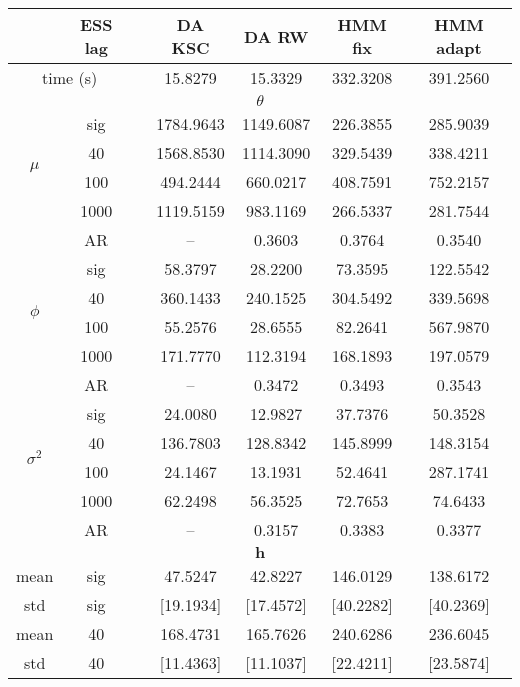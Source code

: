 { \renewcommand{\arraystretch}{1.2} 
\begin{table} 
\center 
\begin{tabular}{ccc cc cc} 
\hline 
 & ESS lag&& DA KSC & DA RW & HMM fix & HMM adapt \\ \hline  \hline
 \multicolumn{2}{c}{time (s)}& & 15.8279  & 15.3329  & 332.3208  & 391.2560  \\  \hline 
\multicolumn{7}{c}{$\theta$} \\ \hline 
\multirow{4}{*}{$\mu$}   & sig &  & 1784.9643  & 1149.6087  & 226.3855  & 285.9039  \\ 
 & 40 &  & 1568.8530  & 1114.3090  & 329.5439  & 338.4211  \\ 
 & 100 &  & 494.2444  & 660.0217  & 408.7591  & 752.2157  \\ 
 & 1000 &  & 1119.5159  & 983.1169  & 266.5337  & 281.7544  \\ 
 & AR & & --  & 0.3603  & 0.3764  & 0.3540  \\ [1.3ex] 
\multirow{4}{*}{$\phi$}   & sig &  & 58.3797  & 28.2200  & 73.3595  & 122.5542  \\ 
 & 40 &  & 360.1433  & 240.1525  & 304.5492  & 339.5698  \\ 
 & 100 &  & 55.2576  & 28.6555  & 82.2641  & 567.9870  \\ 
 & 1000 &  & 171.7770  & 112.3194  & 168.1893  & 197.0579  \\ 
 & AR & & --  & 0.3472  & 0.3493  & 0.3543  \\ [1.3ex] 
\multirow{4}{*}{$\sigma^2$}   & sig &  & 24.0080  & 12.9827  & 37.7376  & 50.3528  \\ 
 & 40 &  & 136.7803  & 128.8342  & 145.8999  & 148.3154  \\ 
 & 100 &  & 24.1467  & 13.1931  & 52.4641  & 287.1741  \\ 
 & 1000 &  & 62.2498  & 56.3525  & 72.7653  & 74.6433  \\ 
 & AR & & --  & 0.3157  & 0.3383  & 0.3377  \\ [1.3ex] 
\hline 
\multicolumn{7}{c}{$ \bm{h} $} \\ \hline 
mean & sig &  & 47.5247  & 42.8227  & 146.0129  & 138.6172  \\ 
std & sig &  & [19.1934]  & [17.4572]  & [40.2282]  & [40.2369]  \\  [1ex]
mean & 40 &  & 168.4731  & 165.7626  & 240.6286  & 236.6045  \\ 
std & 40 &  & [11.4363]  & [11.1037]  & [22.4211]  & [23.5874]  \\  [1ex]

\end{tabular}
\end{table}}
